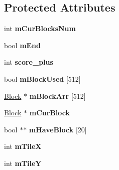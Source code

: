 \subsection*{Protected Attributes}
\begin{DoxyCompactItemize}
\item 
\hypertarget{class_block_manager_a063fa719baa0dbf70ac976184be6c4a4}{int {\bfseries m\-Cur\-Blocks\-Num}}\label{class_block_manager_a063fa719baa0dbf70ac976184be6c4a4}

\item 
\hypertarget{class_block_manager_aeede5bfde3880f053bd137a03959527d}{bool {\bfseries m\-End}}\label{class_block_manager_aeede5bfde3880f053bd137a03959527d}

\item 
\hypertarget{class_block_manager_af9324df428403b998ca0f7cc261957ea}{int {\bfseries score\-\_\-plus}}\label{class_block_manager_af9324df428403b998ca0f7cc261957ea}

\item 
\hypertarget{class_block_manager_adf8b2993edb68348c6a332b32c0d0091}{bool {\bfseries m\-Block\-Used} \mbox{[}512\mbox{]}}\label{class_block_manager_adf8b2993edb68348c6a332b32c0d0091}

\item 
\hypertarget{class_block_manager_a189ed2c62d6b8a073362d50bc3eea878}{\hyperlink{class_block}{Block} $\ast$ {\bfseries m\-Block\-Arr} \mbox{[}512\mbox{]}}\label{class_block_manager_a189ed2c62d6b8a073362d50bc3eea878}

\item 
\hypertarget{class_block_manager_a74ea47f30b1e7e9a4ee79178ffd55d5c}{\hyperlink{class_block}{Block} $\ast$ {\bfseries m\-Cur\-Block}}\label{class_block_manager_a74ea47f30b1e7e9a4ee79178ffd55d5c}

\item 
\hypertarget{class_block_manager_a287f3fa8101352c798b227c476a2132d}{bool $\ast$$\ast$ {\bfseries m\-Have\-Block} \mbox{[}20\mbox{]}}\label{class_block_manager_a287f3fa8101352c798b227c476a2132d}

\item 
\hypertarget{class_block_manager_a190720e7f674d746ed2b0ae2edeb3c8a}{int {\bfseries m\-Tile\-X}}\label{class_block_manager_a190720e7f674d746ed2b0ae2edeb3c8a}

\item 
\hypertarget{class_block_manager_a4ef275284527b132d50a80a796a0efab}{int {\bfseries m\-Tile\-Y}}\label{class_block_manager_a4ef275284527b132d50a80a796a0efab}


\end{DoxyCompactItemize}
